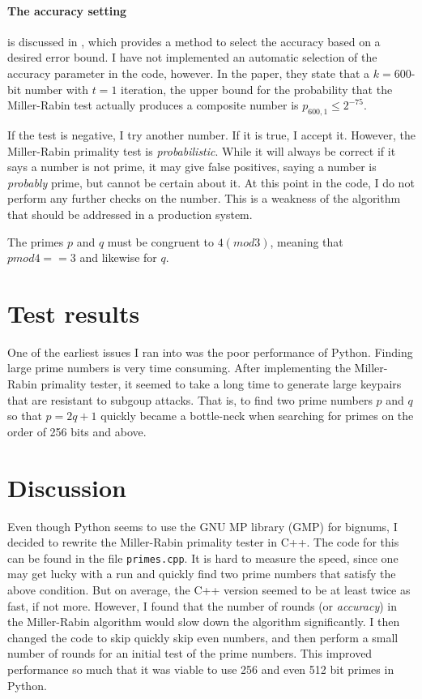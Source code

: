 \documentclass[a4paper,english,12pt]{article}
\begin{document}
\paragraph{The accuracy setting} is discussed in \cite{damgaard1993average}, which
provides a method to select the accuracy based on a desired error bound. I have
not implemented an automatic selection of the accuracy parameter in the code,
however. In the paper, they state that a $k=600$-bit number with $t=1$
iteration, the upper bound for the probability that the Miller-Rabin test
actually produces a composite number is $p_{600, 1} \leqslant 2^{-75}$.

If the test is negative, I try another number. If it is true, I accept
it. However, the Miller-Rabin primality test is \textit{probabilistic}. While
it will always be correct if it says a number is not prime, it may give false
positives, saying a number is \textit{probably} prime, but cannot be certain
about it. At this point in the code, I do not perform any further checks on the
number. This is a weakness of the algorithm that should be addressed in a
production system.

The primes $p$ and $q$ must be congruent to $4 (mod 3)$, meaning that $p mod 4
== 3$ and likewise for $q$.

\section{Test results}
One of the earliest issues I ran into was the poor performance of Python.
Finding large prime numbers is very time consuming. After implementing the
Miller-Rabin primality tester, it seemed to take a long time to generate large
keypairs that are resistant to subgoup attacks. That is, to find two prime
numbers $p$ and $q$ so that $p = 2q+1$ quickly became a bottle-neck when
searching for primes on the order of 256 bits and above.

\section{Discussion}
Even though Python seems to use the GNU MP library (GMP) for bignums, I decided
to rewrite the Miller-Rabin primality tester in C++. The code for this can be
found in the file \texttt{primes.cpp}. It is hard to measure the speed, since
one may get lucky with a run and quickly find two prime numbers that satisfy
the above condition. But on average, the C++ version seemed to be at least
twice as fast, if not more. However, I found that the number of rounds (or
\textit{accuracy}) in the Miller-Rabin algorithm would slow down the algorithm
significantly. I then changed the code to skip quickly skip even numbers, and
then perform a small number of rounds for an initial test of the prime numbers.
This improved performance so much that it was viable to use 256 and even 512
bit primes in Python.
\end{document}
